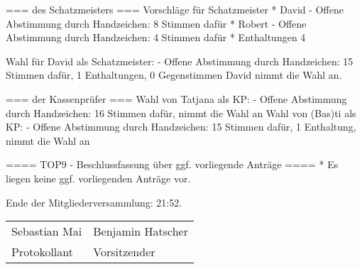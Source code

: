 \documentclass[a4paper,12pt,titlepage]{scrartcl}
\begin{document}
=== des Schatzmeisters ===
Vorschläge für Schatzmeister
* David - Offene Abstimmung durch Handzeichen: 8 Stimmen dafür 
* Robert - Offene Abstimmung durch Handzeichen: 4 Stimmen dafür 
* Enthaltungen 4

Wahl für David als Schatzmeister:
    - Offene Abstimmung durch Handzeichen: 15 Stimmen dafür, 1 Enthaltungen, 0 Gegenstimmen
    David nimmt die Wahl an.


=== der Kassenprüfer ===
Wahl von Tatjana als KP: - Offene Abstimmung durch Handzeichen: 16 Stimmen dafür, nimmt die Wahl an
Wahl von (Bas)ti als KP: - Offene Abstimmung durch Handzeichen: 15 Stimmen dafür, 1 Enthaltung, nimmt die Wahl an


==== TOP9 - Beschlussfassung über ggf. vorliegende Anträge ====
* Es liegen keine ggf. vorliegenden Anträge vor.

Ende der Mitgliederversammlung: 21:52.


\nopagebreak
\vspace{10\baselineskip}
\begin{tabularx}{\textwidth}[b]{X X}
	\hline
	Sebastian Mai  & Benjamin Hatscher \\
	Protokollant & Vorsitzender
\end{tabularx}

\appendix
%
\end{document}
